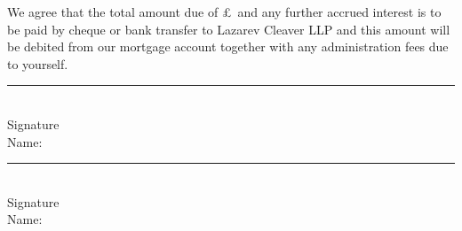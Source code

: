 \documentclass{article}
\begin{document}
\vspace{4 mm}
\noindent We agree that the total amount due of £\total\ and any further accrued interest is to be
paid by cheque or bank transfer to Lazarev Cleaver LLP and this amount will be debited from
our mortgage account together with any administration fees due to yourself.

\vspace{6 mm}
\begin{multicols}{2}
\noindent \rule{4cm}{0.15mm}\\
Signature\\
Name:

\columnbreak
\noindent \rule{4cm}{0.15mm}\\
Signature\\
Name:

\end{multicols}
\end{document}
